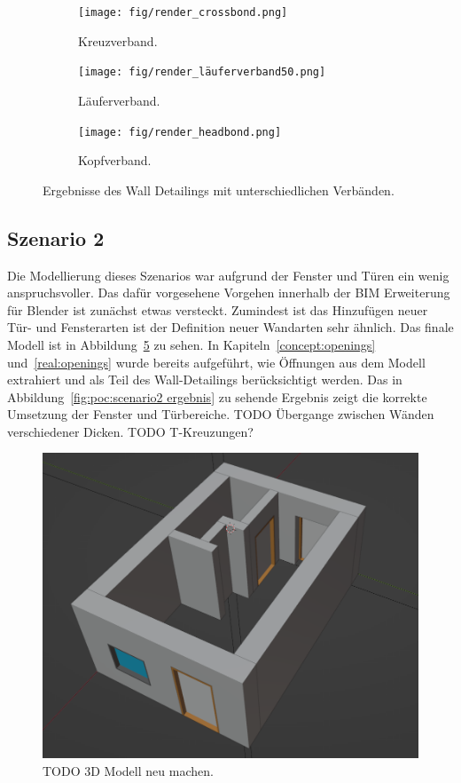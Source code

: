 \begin{figure}[htb]
    \begin{subfigure}[b]{0.3\columnwidth}
      \texttt{[image: fig/render\_crossbond.png]}
      \caption{Kreuzverband.}\label{fig:poc:render_crossbond}
    \end{subfigure}
    \hfill
    \begin{subfigure}[b]{0.3\columnwidth}
      \texttt{[image: fig/render\_läuferverband50.png]}
      \caption{Läuferverband.}\label{fig:poc:render_laeuferverband50}
    \end{subfigure}
    \hfill
    \begin{subfigure}[b]{0.3\columnwidth}
      \texttt{[image: fig/render\_headbond.png]}
      \caption{Kopfverband.}\label{fig:poc:render_headbond}
    \end{subfigure}
    \caption{Ergebnisse des Wall Detailings mit unterschiedlichen Verbänden.}\label{fig:poc:result_scenario1}
\end{figure}

\subsection{Szenario 2}\label{poc:scenario2}
Die Modellierung dieses Szenarios war aufgrund der Fenster und Türen ein wenig anspruchsvoller.
Das dafür vorgesehene Vorgehen innerhalb der BIM Erweiterung für Blender ist zunächst etwas versteckt.
Zumindest ist das Hinzufügen neuer Tür- und Fensterarten ist der Definition neuer Wandarten sehr ähnlich.
Das finale Modell ist in Abbildung~\ref{fig:poc:scenario2 modell} zu sehen.
In Kapiteln~\ref{concept:openings} und~\ref{real:openings} wurde bereits aufgeführt, wie Öffnungen aus dem Modell extrahiert und als Teil des Wall-Detailings berücksichtigt werden.
Das in Abbildung~\ref{fig:poc:scenario2 ergebnis} zu sehende Ergebnis zeigt die korrekte Umsetzung der Fenster und Türbereiche.
TODO Übergange zwischen Wänden verschiedener Dicken.
TODO T-Kreuzungen?

\begin{figure}[hb]
  \centering
  \includegraphics[width=0.5\columnwidth]{fig/scenario1_screenshot.png}
  \caption{TODO 3D Modell neu machen.}\label{fig:poc:scenario2 modell}
\end{figure}

